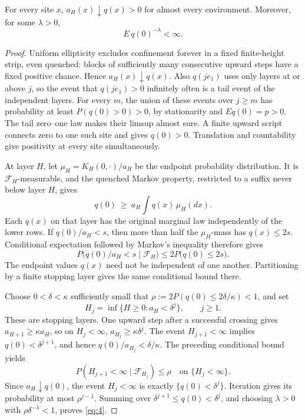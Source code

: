 \begin{lemma}\label{geom-inverse}
For every site \(x\), \(a_H(x)\downarrow q(x)>0\) for almost every
environment. Moreover, for some \(\lambda>0\),
\[
E\,q(0)^{-\lambda}<\infty. \tag{4}\label{eq:4}
\]
\end{lemma}

\begin{proof}
Uniform ellipticity excludes confinement forever in a fixed finite-height
strip, even quenched: blocks of sufficiently many consecutive upward
steps have a fixed positive chance. Hence \(a_H(x)\downarrow q(x)\).
Also \(q(je_1)\) uses only layers at or above \(j\), so the event that
\(q(je_1)>0\) infinitely often is a tail event of the independent layers.
For every \(m\), the union of these events over \(j\ge m\) has
probability at least \(P(q(0)>0)>0\), by stationarity and \(Eq(0)=p>0\).
The tail zero--one law makes their limsup almost sure. A finite upward
script connects zero to one such site and gives \(q(0)>0\). Translation
and countability give positivity at every site simultaneously.

At layer \(H\), let \(\mu_H=K_H(0,\cdot)/a_H\) be the endpoint
probability distribution. It is \(\mathcal F_H\)-measurable, and the
quenched Markov property, restricted to a suffix never below layer \(H\),
gives
\[
q(0)\ \ge\ a_H\int q(x)\,\mu_H(dx).
\]
Each \(q(x)\) on that layer has the original marginal law independently
of the lower rows. If \(q(0)/a_H<s\), then more than half the
\(\mu_H\)-mass has \(q(x)\le2s\). Conditional expectation followed by
Markov's inequality therefore gives
\[
P\big(q(0)/a_H<s\mid\mathcal F_H\big)
\le2P\big(q(0)\le2s\big).
\]
The endpoint values \(q(x)\) need not be independent of one another.
Partitioning by a finite stopping layer gives the same conditional bound
there.

Choose \(0<\delta<\kappa\) sufficiently small that
\(\rho:=2P(q(0)\le2\delta/\kappa)<1\), and set
\[
H_j=\inf\{H\ge0:a_H<\delta^j\},\qquad j\ge1.
\]
These are stopping layers. One upward step after a successful crossing
gives \(a_{H+1}\ge\kappa a_H\), so on \(H_j<\infty\),
\(a_{H_j}\ge\kappa\delta^j\). The event \(H_{j+1}<\infty\) implies
\(q(0)<\delta^{j+1}\), and hence
\(q(0)/a_{H_j}<\delta/\kappa\). The preceding conditional bound yields
\[
P(H_{j+1}<\infty\mid\mathcal F_{H_j})\le\rho
\quad\text{on }\{H_j<\infty\}.
\]
Since \(a_H\downarrow q(0)\), the event \(H_j<\infty\) is exactly
\(\{q(0)<\delta^j\}\). Iteration gives its probability at most
\(\rho^{j-1}\). Summing over
\(\delta^{j+1}\le q(0)<\delta^j\), and choosing \(\lambda>0\) with
\(\rho\delta^{-\lambda}<1\), proves \eqref{eq:4}.
\end{proof}


